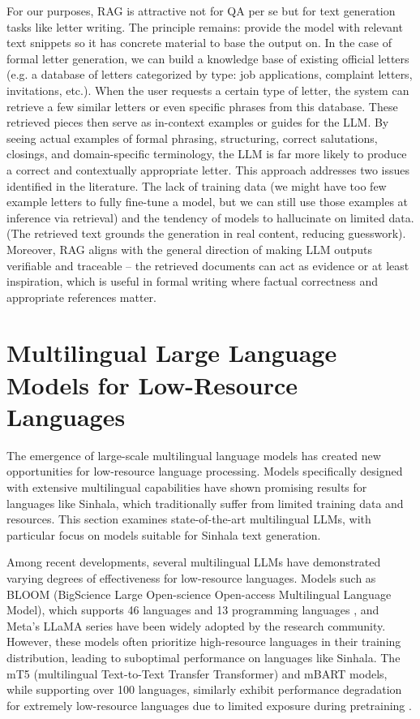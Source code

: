 \documentclass[12pt]{uomthesis}
\begin{document}
For our purposes, RAG is attractive not for QA per se but for text generation tasks like letter writing. The principle remains: provide the model with relevant text snippets so it has concrete material to base the output on. In the case of formal letter generation, we can build a knowledge base of existing official letters (e.g. a database of letters categorized by type: job applications, complaint letters, invitations, etc.). When the user requests a certain type of letter, the system can retrieve a few similar letters or even specific phrases from this database. These retrieved pieces then serve as in-context examples or guides for the LLM. By seeing actual examples of formal phrasing, structuring, correct salutations, closings, and domain-specific terminology, the LLM is far more likely to produce a correct and contextually appropriate letter. This approach addresses two issues identified in the literature. The lack of training data (we might have too few example letters to fully fine-tune a model, but we can still use those examples at inference via retrieval) and the tendency of models to hallucinate on limited data.(The retrieved text grounds the generation in real content, reducing guesswork). Moreover, RAG aligns with the general direction of making LLM outputs verifiable and traceable – the retrieved documents can act as evidence or at least inspiration, which is useful in formal writing where factual correctness and appropriate references matter.

\section{Multilingual Large Language Models for Low-Resource Languages}
The emergence of large-scale multilingual language models has created new opportunities for low-resource language processing. Models specifically designed with extensive multilingual capabilities have shown promising results for languages like Sinhala, which traditionally suffer from limited training data and resources. This section examines state-of-the-art multilingual LLMs, with particular focus on models suitable for Sinhala text generation.

Among recent developments, several multilingual LLMs have demonstrated varying degrees of effectiveness for low-resource languages. Models such as BLOOM (BigScience Large Open-science Open-access Multilingual Language Model), which supports 46 languages and 13 programming languages \cite{30}, and Meta's LLaMA series have been widely adopted by the research community. However, these models often prioritize high-resource languages in their training distribution, leading to suboptimal performance on languages like Sinhala. The mT5 (multilingual Text-to-Text Transfer Transformer) and mBART models, while supporting over 100 languages, similarly exhibit performance degradation for extremely low-resource languages due to limited exposure during pretraining \cite{2}.
\end{document}
